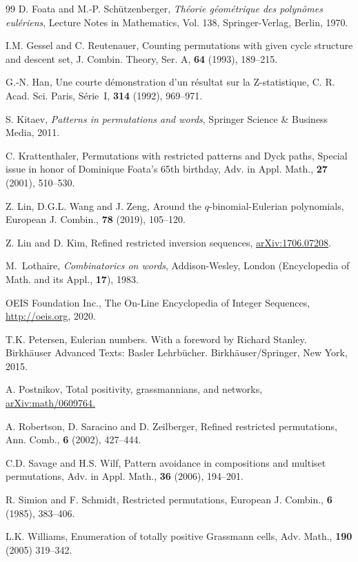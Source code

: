 \documentclass[12pt]{amsart}
\numberwithin{equation}{section}
\theoremstyle{plain}
\theoremstyle{definition}
\begin{document}
\begin{thebibliography}{99}
 D. Foata and M.-P. Sch\"utzenberger, {\em Th\'eorie g\'eom\'etrique des polyn\^omes eul\'eriens}, Lecture Notes in Mathematics, Vol. 138, Springer-Verlag, Berlin, 1970.

 I.M. Gessel and C. Reutenauer, Counting permutations with given cycle structure and descent set, J. Combin. Theory, Ser. A, {\bf64} (1993), 189--215.


 G.-N. Han, Une courte d\'emonstration d'un r\'esultat sur la Z-statistique, C. R. Acad. Sci. Paris, S\'erie~I,  {\bf 314} (1992),  969--971.


 S. Kitaev, {\em Patterns in permutations and words}, Springer Science \& Business Media, 2011. 

C. Krattenthaler, Permutations with restricted patterns and Dyck paths, 
Special issue in honor of Dominique Foata's 65th birthday, 
Adv. in Appl. Math., {\bf27} (2001), 510--530.

Z. Lin, D.G.L. Wang and J. Zeng,  Around the $q$-binomial-Eulerian polynomials, European J. Combin., {\bf78} (2019), 105--120. 

  Z. Lin and D. Kim, Refined restricted inversion sequences, \href{https://arxiv.org/abs/1706.07208}{arXiv:1706.07208}. 

M.~Lothaire, {\em Combinatorics on words}, Addison-Wesley, London (Encyclopedia of Math. and its Appl., {\bf 17}), 1983.

 
 OEIS Foundation Inc., The On-Line Encyclopedia of Integer Sequences,  \href{http://oeis.org}{http://oeis.org}, 2020.

 T.K. Petersen, Eulerian numbers. With a foreword by Richard Stanley. Birkh\"auser Advanced Texts: Basler Lehrb\"ucher. Birkh\"auser/Springer, New York, 2015.
 
  A. Postnikov, Total positivity, grassmannians, and networks, \href{https://arxiv.org/abs/math/0609764}{arXiv:math/0609764.} 
 
\goodbreak

 A. Robertson, D. Saracino and D. Zeilberger, Refined restricted permutations, Ann. Comb., {\bf6} (2002), 427--444.
	

 C.D. Savage and H.S. Wilf, Pattern avoidance in compositions and multiset permutations, Adv. in Appl. Math., {\bf36} (2006), 194--201.

 R. Simion and F. Schmidt,  Restricted permutations, European J. Combin.,  {\bf6} (1985), 383--406.

 L.K. Williams, Enumeration of totally positive Grassmann cells, Adv. Math., {\bf190} (2005) 319--342.


\end{thebibliography}
\end{document}
